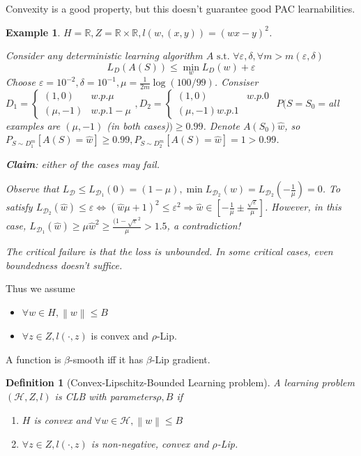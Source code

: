 \documentclass{book}
\newcommand{\R}{\mathbb{R}}
\newcommand{\st}{\text{ s.t. }}
\newcommand{\nm}[1]{\left\|#1\right\|}
\renewcommand{\H}{\mathcal{H}}
\newcommand{\D}{\mathcal{D}}
\newtheorem{Def}{Definition}[section]
\newtheorem{Eg}{Example}[section]
\begin{document}
Convexity is a good property, but this doesn't guarantee good PAC learnabilities. 
\begin{Eg}
  $H=\R,Z=\R\times \R,l(w,(x,y))=(wx-y)^{2}$.

  Consider any deterministic learning algorithm $A\st\forall\varepsilon,\delta,\forall m>m(\varepsilon,\delta)$
  \[L_{D}(A(S))\leq \min_{w}L_{D}(w)+\varepsilon\]
  Choose $\varepsilon=10^{-2},\delta=10^{-1}, \mu=\frac{1}{2m}\log(100/99)$. Consiser $D_{1}=  \begin{cases} (1,0)& w.p. \mu\\ (\mu,-1)&w.p. 1-\mu \end{cases}, D_{2}=
  \begin{cases}
    (1,0)& w.p. 0\\ (\mu,-1) w.p. 1
  \end{cases}
  $
  $P(S=S_{0}=$all examples are $(\mu,-1)$ (in both cases)$)\geq 0.99$. Denote $A \left( S_{0} \right)\hat{w}$, so $P_{S\sim D_1^m}[A \left( S \right)=\hat{w}]\geq 0.99, P_{S\sim D_2^m}[A \left( S \right)=\hat{w}]=1>0.99$.
  
\textbf{Claim}: either of the cases may fail.

Observe that $L_{\mathcal{D}}\leq L_{\D_1} \left( 0 \right)= \left( 1-\mu \right), \min L_{\D_2}(w)=L_{\D_2} \left( -\frac{1}{\mu} \right)=0$. To satisfy $L_{\D_2} \left( \hat{w} \right)\leq \varepsilon\Leftrightarrow \left( \hat{w}\mu+1 \right)^2\leq \varepsilon^2\Rightarrow \hat{w}\in \left[ -\frac{1}{\mu}\pm \frac{\sqrt{\varepsilon}}{\mu} \right]$. However, in this case, $L_{\D_1} \left( \hat{w} \right)\geq \mu \hat{w}^{2}\geq \frac{(1-\sqrt{\varepsilon}^2}{\mu}>1.5$, a contradiction!

  The critical failure is that the loss is unbounded. In some critical cases, even boundedness doesn't suffice.
\end{Eg}

Thus we assume
\begin{itemize}
\item $\forall w\in H,\nm{w}\leq B$
\item $\forall z\in Z, l(\cdot,z)$ is convex and $\rho$-Lip.
\end{itemize}

A function is $\beta$-smooth iff it has $\beta$-Lip gradient.

\begin{Def}[Convex-Lipschitz-Bounded Learning problem]
  A learning problem $(\H,Z,l)$ is CLB with parameters$ \rho,B$ if
  \begin{enumerate}
  \item $H$ is convex and $\forall w\in \H,\nm{w}\leq B$
  \item $\forall z\in Z, l(\cdot,z)$ is non-negative, convex and $\rho$-Lip.
  \end{enumerate}

\end{Def}
\end{document}
